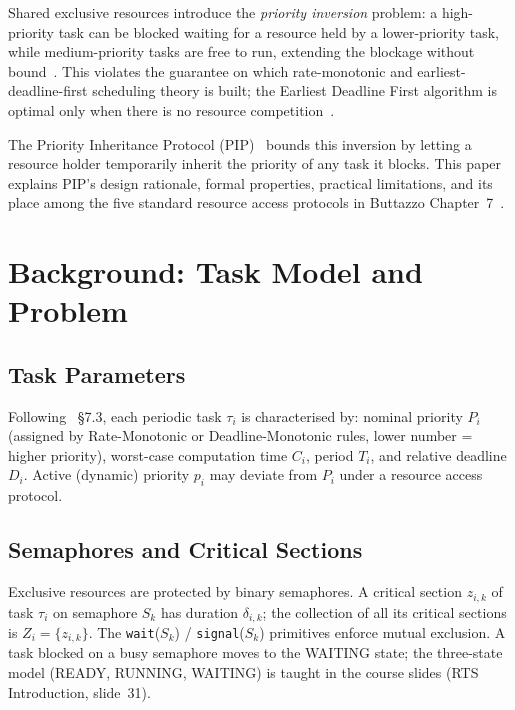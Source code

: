\documentclass[conference]{IEEEtran}
\begin{document}
Shared exclusive resources introduce the \emph{priority inversion}
problem: a high-priority task can be blocked waiting for a resource
held by a lower-priority task, while medium-priority tasks are free
to run, extending the blockage without bound~\cite{Buttazzo2011}.
This violates the guarantee on which rate-monotonic and earliest-deadline-first
scheduling theory is built; the Earliest Deadline First algorithm is
optimal only when there is no resource competition~\cite{Kopetz2011}.

The Priority Inheritance Protocol (PIP)~\cite{Sha1990} bounds this
inversion by letting a resource holder temporarily inherit the priority
of any task it blocks.
This paper explains PIP's design rationale, formal properties, practical
limitations, and its place among the five standard resource access protocols
in Buttazzo Chapter~7~\cite{Buttazzo2011}.

\section{Background: Task Model and Problem}
\label{sec:background}

\subsection{Task Parameters}

Following~\cite{Buttazzo2011} §7.3, each periodic task $\tau_i$ is
characterised by: nominal priority $P_i$ (assigned by Rate-Monotonic
or Deadline-Monotonic rules, lower number = higher priority),
worst-case computation time $C_i$, period $T_i$, and relative
deadline $D_i$.
Active (dynamic) priority $p_i$ may deviate from $P_i$ under a
resource access protocol.

\subsection{Semaphores and Critical Sections}

Exclusive resources are protected by binary semaphores.
A critical section $z_{i,k}$ of task $\tau_i$ on semaphore $S_k$ has
duration $\delta_{i,k}$; the collection of all its critical sections
is $Z_i = \{z_{i,k}\}$.
The \texttt{wait}($S_k$) / \texttt{signal}($S_k$) primitives enforce mutual
exclusion.
A task blocked on a busy semaphore moves to the WAITING state;
the three-state model (READY, RUNNING, WAITING) is taught in the
course slides (RTS Introduction, slide~31).
\end{document}
